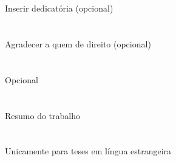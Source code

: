 \documentclass[11pt,twoside]{estiloUBI}
\begin{document}
\onehalfspacing





\pagestyle{fancy}


\cleardoublepage



\newpage 
\section*{}
\vspace{0.5cm}
Inserir dedicatória (opcional)
\cleardoublepage


\newpage 	
\section*{}
\vspace{0.5cm}
Agradecer a quem de direito (opcional)
\cleardoublepage


\newpage 	
\section*{}
\vspace{0.5cm}
Opcional
\cleardoublepage


\newpage 	
\section*{}
\vspace{0.5cm}
Resumo do trabalho
 
\vspace{2.2cm}
{}
\vspace{0.8cm}

\cleardoublepage


\newpage 	
\section*{}
\vspace{0.5cm}
Unicamente para teses em língua estrangeira
\cleardoublepage
\end{document}
